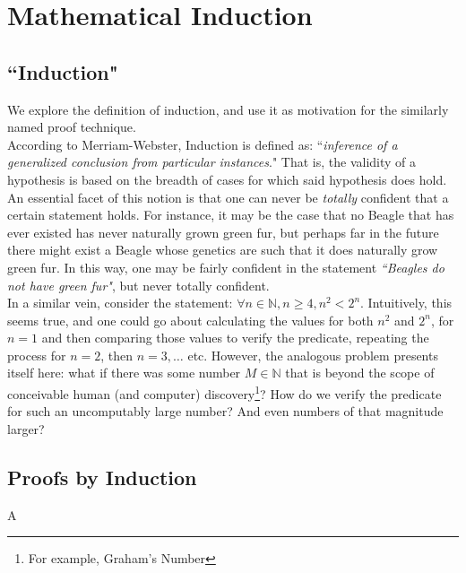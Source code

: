 \chapter{Mathematical Induction}


\section{``Induction"}
We explore the definition of induction, and use it as motivation for the similarly named proof technique. \\

According to Merriam-Webster, Induction is defined as: ``\emph{inference of a generalized conclusion from particular instances}." That is, the validity of a hypothesis is based on the breadth of cases for which said hypothesis does hold.\\

An essential facet of this notion is that one can never be \emph{totally} confident that a certain statement holds. For instance, it may be the case that no Beagle that has ever existed has never naturally grown green fur, but perhaps far in the future there might exist a Beagle whose genetics are such that it does naturally grow green fur. In this way, one may be fairly confident in the statement \emph{``Beagles do not have green fur"}, but never totally confident. \\

 In a similar vein, consider the statement: $\forall n \in \mathbb{N}, n \geq 4, n^2 < 2^n$. Intuitively, this seems true, and one could go about calculating the values for both $n^2$ and $2^n$, for $n = 1$ and then comparing those values to verify the predicate, repeating the process for $n=2$, then $n=3, \ldots$  etc. However, the analogous problem presents itself here: what if there was some number $M \in \mathbb{N}$ that is beyond the scope of conceivable human (and computer) discovery\footnote{For example, Graham's Number}? How do we verify the predicate for such an uncomputably large number? And even numbers of that magnitude larger?

\section{Proofs by Induction}
  A
